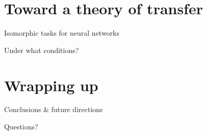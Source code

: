 \documentclass{beamer}
\begin{document}
\section{Toward a theory of transfer}

\begin{frame}{Isomorphic tasks for neural networks}

\end{frame}

\begin{frame}{Under what conditions?}

\end{frame}



\section{Wrapping up}

\begin{frame}{Conclusions \& future directions}

\end{frame}


\begin{frame}[standout]
Questions?
\end{frame}

\begin{frame}[allowframebreaks]

{\tiny }
\end{frame}
\end{document}
